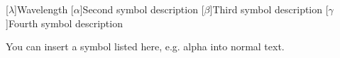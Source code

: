 \listofsymbols

\begin{acronym}[]
  [$\lambda$]{Wavelength}
  [$\alpha$]{Second symbol description}
  [$\beta$]{Third symbol description}
  [$\gamma$]{Fourth symbol description}
\end{acronym}

You can insert a symbol listed here, e.g. \acs{alpha} into normal
text.

